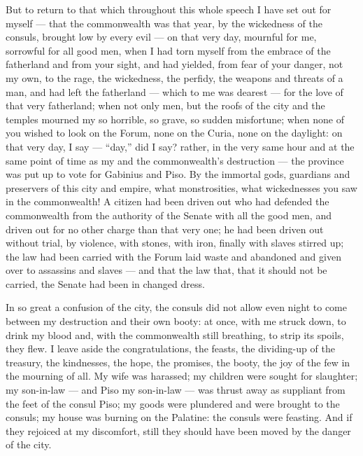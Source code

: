  But to return to that which throughout this whole speech I have set out for myself --- that the commonwealth was that year, by the wickedness of the consuls, brought low by every evil --- on that very day, mournful for me, sorrowful for all good men, when I had torn myself from the embrace of the fatherland and from your sight, and had yielded, from fear of your danger, not my own, to the rage, the wickedness, the perfidy, the weapons and threats of a man, and had left the fatherland --- which to me was dearest --- for the love of that very fatherland; when not only men, but the roofs of the city and the temples mourned my so horrible, so grave, so sudden misfortune; when none of you wished to look on the Forum, none on the Curia, none on the daylight: on that very day, I say --- ``day,'' did I say? rather, in the very same hour and at the same point of time as my and the commonwealth's destruction --- the province was put up to vote for Gabinius and Piso. By the immortal gods, guardians and preservers of this city and empire, what monstrosities, what wickednesses you saw in the commonwealth! A citizen had been driven out who had defended the commonwealth from the authority of the Senate with all the good men, and driven out for no other charge than that very one; he had been driven out without trial, by violence, with stones, with iron, finally with slaves stirred up; the law had been carried with the Forum laid waste and abandoned and given over to assassins and slaves --- and that the law that, that it should not be carried, the Senate had been in changed dress.

 In so great a confusion of the city, the consuls did not allow even night to come between my destruction and their own booty: at once, with me struck down, to drink my blood and, with the commonwealth still breathing, to strip its spoils, they flew. I leave aside the congratulations, the feasts, the dividing-up of the treasury, the kindnesses, the hope, the promises, the booty, the joy of the few in the mourning of all. My wife was harassed; my children were sought for slaughter; my son-in-law --- and Piso my son-in-law --- was thrust away as suppliant from the feet of the consul Piso; my goods were plundered and were brought to the consuls; my house was burning on the Palatine: the consuls were feasting. And if they rejoiced at my discomfort, still they should have been moved by the danger of the city.

